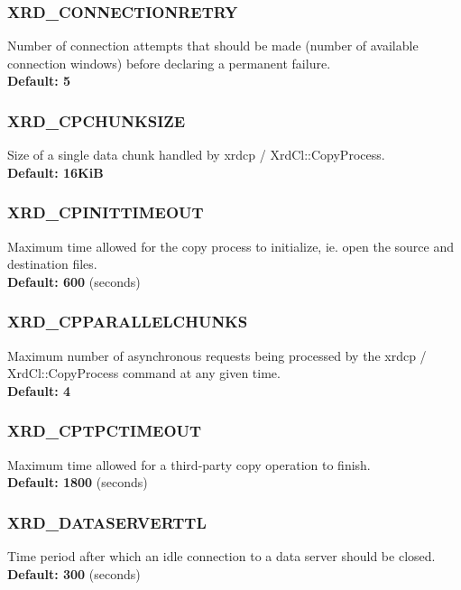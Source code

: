 \documentclass{article}
\begin{document}
		\subsubsection{XRD_CONNECTIONRETRY}
		\label{env:connectionretry}
		    Number of connection attempts that should be made (number of available connection windows) before declaring 
		    a permanent failure. \\
		    \textbf{Default: 5}
		
		\subsubsection{XRD_CPCHUNKSIZE}
		\label{env:cpchunksize}
		    Size of a single data chunk handled by xrdcp / XrdCl::CopyProcess. \\
		    \textbf{Default: 16KiB}
		    		
		\subsubsection{XRD_CPINITTIMEOUT}
		\label{env:cpinittimeout}
		    Maximum time allowed for the copy process to initialize, ie. open the source and destination files. \\
		    \textbf{Default: 600} (seconds)
		    
		\subsubsection{XRD_CPPARALLELCHUNKS}
		\label{env:cpparallelchunks}
		    Maximum number of asynchronous requests being processed by the xrdcp / XrdCl::CopyProcess command at any given 
		    time. \\
		    \textbf{Default: 4}
		    
		\subsubsection{XRD_CPTPCTIMEOUT}
		\label{env:cptpctimeout}
		    Maximum time allowed for a third-party copy operation to finish. \\
		    \textbf{Default: 1800} (seconds)
		    
		\subsubsection{XRD_DATASERVERTTL}
		\label{env:dataserverttl}
		    Time period after which an idle connection to a data server should
		    be closed. \\
		    \textbf{Default: 300} (seconds)
		    
\end{document}
